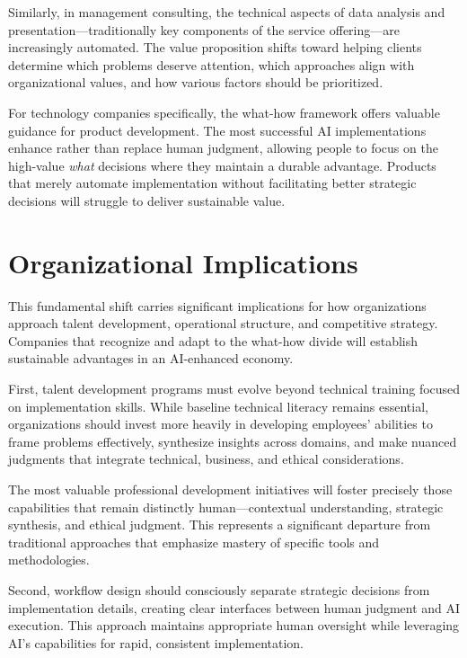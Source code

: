 \documentclass[
  Letterpaper,
]{scrbook}
\begin{document}
Similarly, in management consulting, the technical aspects of data
analysis and presentation---traditionally key components of the service
offering---are increasingly automated. The value proposition shifts
toward helping clients determine which problems deserve attention, which
approaches align with organizational values, and how various factors
should be prioritized.

For technology companies specifically, the what-how framework offers
valuable guidance for product development. The most successful AI
implementations enhance rather than replace human judgment, allowing
people to focus on the high-value \emph{what} decisions where they
maintain a durable advantage. Products that merely automate
implementation without facilitating better strategic decisions will
struggle to deliver sustainable value.

\section{Organizational Implications}\label{organizational-implications}

This fundamental shift carries significant implications for how
organizations approach talent development, operational structure, and
competitive strategy. Companies that recognize and adapt to the what-how
divide will establish sustainable advantages in an AI-enhanced economy.

First, talent development programs must evolve beyond technical training
focused on implementation skills. While baseline technical literacy
remains essential, organizations should invest more heavily in
developing employees' abilities to frame problems effectively,
synthesize insights across domains, and make nuanced judgments that
integrate technical, business, and ethical considerations.

The most valuable professional development initiatives will foster
precisely those capabilities that remain distinctly human---contextual
understanding, strategic synthesis, and ethical judgment. This
represents a significant departure from traditional approaches that
emphasize mastery of specific tools and methodologies.

Second, workflow design should consciously separate strategic decisions
from implementation details, creating clear interfaces between human
judgment and AI execution. This approach maintains appropriate human
oversight while leveraging AI's capabilities for rapid, consistent
implementation.
\end{document}
